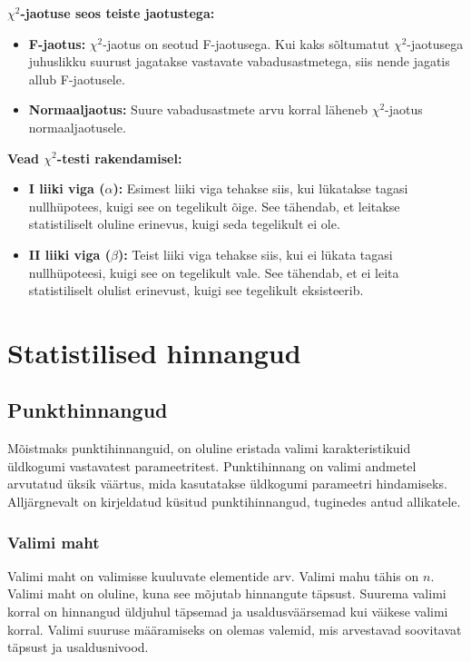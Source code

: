 \documentclass[
]{book}
\providecommand{\tightlist}{%
  \setlength{\itemsep}{0pt}\setlength{\parskip}{0pt}}
\theoremstyle{definition}
\theoremstyle{definition}
\theoremstyle{definition}
\theoremstyle{definition}
\theoremstyle{remark}
\begin{document}
\textbf{\(\chi^2\)-jaotuse seos teiste jaotustega:}

\begin{itemize}
\tightlist
\item
  \textbf{F-jaotus:} \(\chi^2\)-jaotus on seotud F-jaotusega. Kui kaks sõltumatut \(\chi^2\)-jaotusega juhuslikku suurust jagatakse vastavate vabadusastmetega, siis nende jagatis allub F-jaotusele.
\item
  \textbf{Normaaljaotus:} Suure vabadusastmete arvu korral läheneb \(\chi^2\)-jaotus normaaljaotusele.
\end{itemize}

\textbf{Vead \(\chi^2\)-testi rakendamisel:}

\begin{itemize}
\tightlist
\item
  \textbf{I liiki viga (\(\alpha\)):} Esimest liiki viga tehakse siis, kui lükatakse tagasi nullhüpotees, kuigi see on tegelikult õige. See tähendab, et leitakse statistiliselt oluline erinevus, kuigi seda tegelikult ei ole.
\item
  \textbf{II liiki viga (\(\beta\)):} Teist liiki viga tehakse siis, kui ei lükata tagasi nullhüpoteesi, kuigi see on tegelikult vale. See tähendab, et ei leita statistiliselt olulist erinevust, kuigi see tegelikult eksisteerib.
\end{itemize}

\chapter{Statistilised hinnangud}\label{statistilised-hinnangud}

\section{Punkthinnangud}\label{punkthinnangud}

Mõistmaks punktihinnanguid, on oluline eristada valimi karakteristikuid üldkogumi vastavatest parameetritest. Punktihinnang on valimi andmetel arvutatud üksik väärtus, mida kasutatakse üldkogumi parameetri hindamiseks. Alljärgnevalt on kirjeldatud küsitud punktihinnangud, tuginedes antud allikatele.

\subsection{Valimi maht}\label{valimi-maht}

Valimi maht on valimisse kuuluvate elementide arv. Valimi mahu tähis on \(n\). Valimi maht on oluline, kuna see mõjutab hinnangute täpsust. Suurema valimi korral on hinnangud üldjuhul täpsemad ja usaldusväärsemad kui väikese valimi korral. Valimi suuruse määramiseks on olemas valemid, mis arvestavad soovitavat täpsust ja usaldusnivood.
\end{document}
